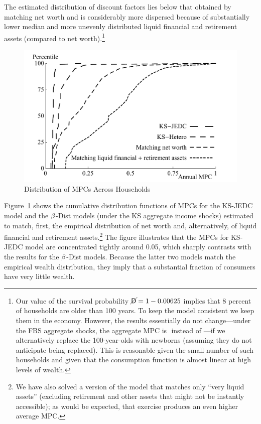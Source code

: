 \documentclass[12pt,titlepage]{econtex}
\begin{document}
The estimated distribution of discount factors lies below that obtained by matching net worth and is considerably more dispersed because of substantially lower median and more unevenly distributed liquid financial and retirement assets (compared to net worth).\footnote{Our value of the survival probability $\cancel{\mathsf{D}}=1 -0.00625$ implies that 8 percent of households are older than 100 years. To keep the model consistent we keep them in the economy.  However, the results essentially do not change---under the FBS aggregate shocks, the aggregate MPC is
  $
   $
  instead of
  $
   $---if we alternatively replace the 100-year-olds with newborns (assuming they do not anticipate being replaced). This is reasonable given the small number of such households and given that the consumption function is almost linear at high levels of wealth.
}

\begin{figure}
  \begin{center}
    \caption{Distribution of MPCs Across Households}
    \label{MPCdist}
    \includegraphics{./Figures/DistributionsMPCsDistSevenAndKSKSAggShocksPlot}
  \end{center}
\end{figure}

Figure~\ref{MPCdist} shows the cumulative distribution functions of
MPCs for the KS-JEDC model and the $\beta$-Dist models (under the KS aggregate income shocks) estimated to match, first, the empirical distribution of net worth and, alternatively, of liquid
financial and retirement assets.\footnote{We have also solved a version of the model
  that matches only ``very liquid assets'' (excluding retirement and other assets that might not be instantly accessible); as would be expected, that exercise produces an even higher average MPC.}  The figure illustrates that the MPCs for KS-JEDC model are concentrated tightly around 0.05, which sharply
contrasts with the results for the $\beta$-Dist models. Because
the latter two models match the empirical wealth distribution, they
imply that a substantial fraction of consumers have very little
wealth.
\end{document}
